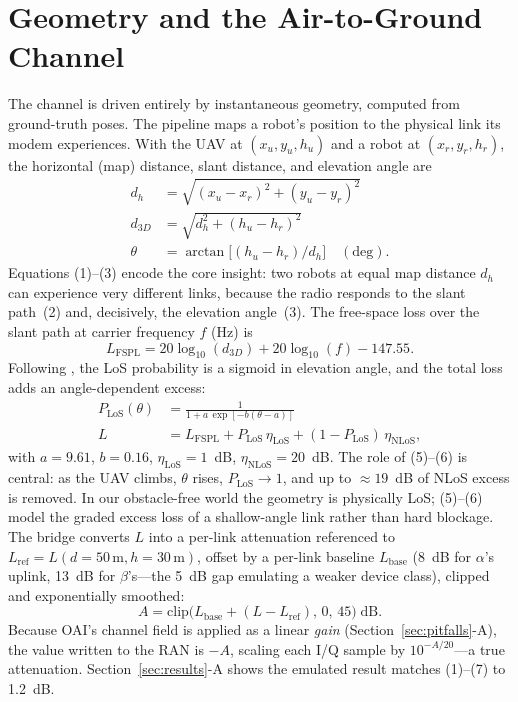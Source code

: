 \documentclass[10pt, conference]{IEEEtran}
\begin{document}
\section{Geometry and the Air-to-Ground Channel}
\label{sec:channel}
The channel is driven entirely by instantaneous geometry, computed from ground-truth poses. The pipeline maps a robot's position to the physical link its modem experiences. With the UAV at $(x_u,y_u,h_u)$ and a robot at $(x_r,y_r,h_r)$, the horizontal (map) distance, slant distance, and elevation angle are
\begin{align}
d_h &= \sqrt{(x_u-x_r)^2 + (y_u-y_r)^2} \\
d_{3D} &= \sqrt{d_h^2 + (h_u-h_r)^2} \\
\theta &= \arctan\!\big[(h_u-h_r)/d_h\big] \quad (\text{deg}).
\end{align}
Equations (1)--(3) encode the core insight: two robots at equal map distance $d_h$ can experience very different links, because the radio responds to the slant path~(2) and, decisively, the elevation angle~(3). The free-space loss over the slant path at carrier frequency $f$ (Hz) is
\begin{equation}
L_{\mathrm{FSPL}} = 20\log_{10}(d_{3D}) + 20\log_{10}(f) - 147.55.
\end{equation}
Following \cite{alhourani2014optimal}, the LoS probability is a sigmoid in elevation angle, and the total loss adds an angle-dependent excess:
\begin{align}
P_{\mathrm{LoS}}(\theta) &= \frac{1}{1 + a\,\exp[-b(\theta-a)]} \\
L &= L_{\mathrm{FSPL}} + P_{\mathrm{LoS}}\,\eta_{\mathrm{LoS}} + (1-P_{\mathrm{LoS}})\,\eta_{\mathrm{NLoS}},
\end{align}
with $a=9.61$, $b=0.16$, $\eta_{\mathrm{LoS}}=1$~dB, $\eta_{\mathrm{NLoS}}=20$~dB. The role of (5)--(6) is central: as the UAV climbs, $\theta$ rises, $P_{\mathrm{LoS}}\!\to\!1$, and up to ${\approx}19$~dB of NLoS excess is removed. In our obstacle-free world the geometry is physically LoS; (5)--(6) model the graded excess loss of a shallow-angle link rather than hard blockage. The bridge converts $L$ into a per-link attenuation referenced to $L_{\mathrm{ref}}=L(d{=}50\,\mathrm{m},h{=}30\,\mathrm{m})$, offset by a per-link baseline $L_{\mathrm{base}}$ (8~dB for $\alpha$'s uplink, 13~dB for $\beta$'s---the 5~dB gap emulating a weaker device class), clipped and exponentially smoothed:
\begin{equation}
A = \mathrm{clip}\big(L_{\mathrm{base}} + (L - L_{\mathrm{ref}}),\, 0,\, 45\big) \;\text{dB}.
\end{equation}
Because OAI's channel field is applied as a linear \emph{gain} (Section~\ref{sec:pitfalls}-A), the value written to the RAN is $-A$, scaling each I/Q sample by $10^{-A/20}$---a true attenuation. Section~\ref{sec:results}-A shows the emulated result matches (1)--(7) to 1.2~dB.
\end{document}
